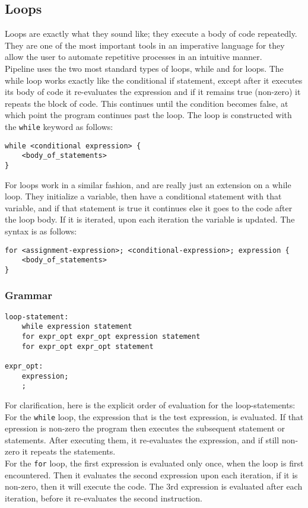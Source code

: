 \documentclass[./LRM_main.tex]{subfiles}
\begin{document}
\subsection{Loops}
Loops are exactly what they sound like; they execute a body of code repeatedly. They are one of the most important tools in an imperative language for they allow the user to automate repetitive processes in an intuitive manner.\\
Pipeline uses the two most standard types of loops, while and for loops. The while loop works exactly like the conditional if statement, except after it executes its body of code it re-evaluates the expression and if it remains true (non-zero) it repeats the block of code. This continues until the condition becomes false, at which point the program continues past the loop. The loop is constructed with the \texttt{while} keyword as follows:
\begin{lstlisting}
while <conditional expression> {
	<body_of_statements>
}
\end{lstlisting}
For loops work in a similar fashion, and are really just an extension on a while loop. They initialize a variable, then have a conditional statement with that variable, and if that statement is true it continues else it goes to the code after the loop body. If it is iterated, upon each iteration the variable is updated. The syntax is as follows:
\begin{lstlisting}
for <assignment-expression>; <conditional-expression>; expression {
	<body_of_statements>
}
\end{lstlisting}
\subsubsection{Grammar}
\begin{lstlisting}
loop-statement:
	while expression statement
	for expr_opt expr_opt expression statement
	for expr_opt expr_opt statement

expr_opt:
	expression;
	;	
\end{lstlisting}
For clarification, here is the explicit order of evaluation for the loop-statements:\\
For the \texttt{while} loop, the expression that is the test expression, is evaluated. If that epression is non-zero the program then executes the subsequent statement or statements. After executing them, it re-evaluates the expression, and if still non-zero it repeats the statements.\\
For the \texttt{for} loop, the first expression is evaluated only once, when the loop is first encountered. Then it evaluates the second expression upon each iteration, if it is non-zero, then it will execute the code. The 3rd expression is evaluated after each iteration, before it re-evaluates the second instruction.
\end{document}
